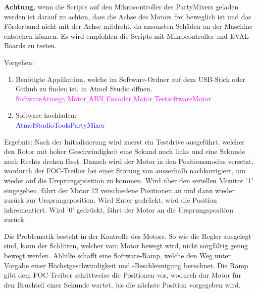 \textbf{Achtung}, wenn die Scripts auf den Mikrocontroller des PartyMixers geladen werden ist darauf zu achten, dass die Achse des Motors frei beweglich ist und das Förderband nicht mit der Achse mitdreht, da ansonsten Schäden an der Maschine entstehen können. Es wird empfohlen die Scripts mit Mikrocontroller und EVAL-Boards zu testen.

Vorgehen:
\begin{enumerate}
\item Benötigte Applikation, welche im Software-Ordner auf dem USB-Stick oder Github \cite{aebi_projekt-6softwareatmega_2020} zu finden ist, in Atmel Studio öffnen.\\
\textcolor{magenta}{Software\textrightarrow Atmega\underline{ }Motor\underline{ }ABN\underline{ }Encoder\underline{ }Motor\underline{ }Testsoftware\textrightarrow Motor}\\

\item Software hochladen:\\
\textcolor{blue}{AtmelStudio\textrightarrow Tools\textrightarrow PartyMixer}\\


\end{enumerate}

Ergebnis: Nach der Initialisierung wird zuerst ein Testdrive ausgeführt, welcher den Rotor mit hoher Geschwindigkeit eine Sekund nach links und eine Sekunde nach Rechts drehen lässt. Danach wird der Motor in den Positionsmodus versetzt, wordurch der FOC-Treiber bei einer Störung von ausserhalb nachkorrigiert, um wieder auf die Ursprungsposition zu kommen. Wird über den seriellen Monitor '1' eingegeben, fährt der Motor 12 verschiedene Positionen an und dann wieder zurück zur Ursprungsposition. Wird Enter gedrückt, wird die Position inkrementiert. Wird '0' gedrückt, fährt der Motor an die Ursprungsposition zurück.

Die Problematik besteht in der Kontrolle des Motors. So wie die Regler ausgelegt sind, kann der Schlitten, welcher vom Motor bewegt wird, nicht sorgfältig genug bewegt werden. Abhilfe schafft eine Software-Ramp, welche den Weg unter Vorgabe einer Höchstgeschwindigkeit und -Beschleunigung berechnet. Die Ramp gibt dem FOC-Treiber schrittweise die Positionen vor, wodurch dur Motor für den Bruchteil einer Sekunde wartet, bis die nächste Position vorgegeben wird.